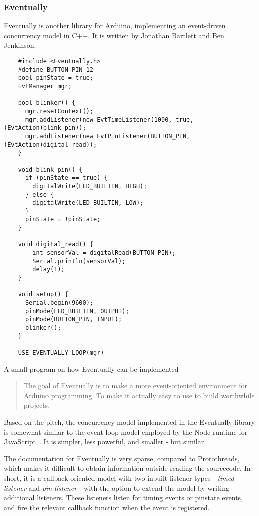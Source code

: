 \subsubsection{Eventually}
Eventually is another library for Arduino, implementing an event-driven concurrency model in C++. It is written by Jonathan Bartlett and Ben Jenkinson.


\begin{listing}
  \begin{verbatim}
    #include <Eventually.h>
    #define BUTTON_PIN 12
    bool pinState = true;
    EvtManager mgr;

    bool blinker() {
      mgr.resetContext();
      mgr.addListener(new EvtTimeListener(1000, true, (EvtAction)blink_pin)); 
      mgr.addListener(new EvtPinListener(BUTTON_PIN, (EvtAction)digital_read));
    }

    void blink_pin() {
      if (pinState == true) {
        digitalWrite(LED_BUILTIN, HIGH);
      } else {
        digitalWrite(LED_BUILTIN, LOW);
      }
      pinState = !pinState;
    }

    void digital_read() {
        int sensorVal = digitalRead(BUTTON_PIN);
        Serial.println(sensorVal);
        delay(1);
    }

    void setup() {
      Serial.begin(9600);
      pinMode(LED_BUILTIN, OUTPUT);
      pinMode(BUTTON_PIN, INPUT);
      blinker();
    }

    USE_EVENTUALLY_LOOP(mgr)
  \end{verbatim}
  \caption{A small program on how Eventually can be implemented}
  \label{lst:eventuallyexample}
\end{listing}


\blockcquote{bartlettEventually2022Bartlett}{The goal of Eventually is to make a more event-oriented environment for Arduino programming. To make it actually easy to use to build worthwhile projects.}

Based on the pitch, the concurrency model implemented in the Eventually library is somewhat similar to the event loop model employed by the Node runtime for JavaScript~\cite{NodeJSdocs}. It is simpler, less powerful, and smaller - but similar.

The documentation for Eventually is very sparse, compared to Protothreads, which makes it difficult to obtain information outside reading the sourcecode. In short, it is a callback oriented model with two inbuilt listener types - \textit{timed listener} and \textit{pin listener} - with the option to extend the model by writing additional listeners. These listeners listen for timing events or pinstate events, and fire the relevant callback function when the event is registered.

